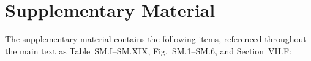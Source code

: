 \documentclass[aip,pof,reprint]{revtex4-2}
\begin{document}

\maketitle








\section*{Supplementary Material}
The supplementary material contains the following items, referenced throughout the main text as Table~SM.I--SM.XIX, Fig.~SM.1--SM.6, and Section~VII.F:
\end{document}
